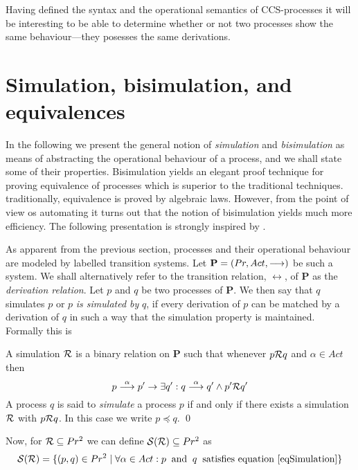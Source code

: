 Having defined the syntax and the operational semantics of CCS-processes it will be interesting to be able to determine whether or not two processes show the same behaviour---they posesses the same derivations.


\section{Simulation, bisimulation, and equivalences}

In the following we present the general notion of {\it simulation\/} and {\it bisimulation\/} as means of abstracting the operational behaviour of a process, and we shall state some of their properties. Bisimulation yields an elegant proof technique for proving equivalence of processes which is superior to the traditional techniques. traditionally, equivalence is proved by algebraic laws. However, from the point of view os automating it turns out that the notion of bisimulation yields much more efficiency. The following presentation is strongly inspired by \cite{Larsen}.

As apparent from the previous section, processes and their operational behaviour are modeled by labelled transition systems. Let $\hbox{\bf P} = ( 
Pr, Act, \stackrel{}{\longrightarrow})$ be such a system. We shall alternatively refer to the transition relation, $\rel{}$, of {\bf P} as the {\it derivation relation}. Let $p$ and $q$ be two processes of {\bf P}. We then say that $q$ simulates $p$ or $p$ {\it is simulated by\/} $q$, if every derivation of $p$ can be matched by a derivation of $q$ in such a way that the simulation property is maintained. Formally this is

\begin{definition}[Simulation]\label{defSimulation}
A simulation $\cal R$ is a binary relation on \hbox{\bf P} such that whenever $p{\cal R}q$ and $\alpha\in Act$ then
\begin{equation}
p\stackrel{\alpha}{\longrightarrow}p' \rightarrow \exists q': q\stackrel{\alpha}{\longrightarrow}q' \wedge p'{\cal R}q'
\label{eqSimulation}
\end{equation}
A process $q$ is said to {\em simulate\/} a process $p$ if and only if there exists a simulation $\cal R$ with $p{\cal R}q$. In this case we write $p\preceq q$.
\qed
\end{definition}

\noindent
Now, for ${\cal R}\subseteq Pr^2$ we can define ${\cal S(R)}\subseteq Pr^2$ as
\begin{equation}
{\cal S(R)} = \{(p,q)\in Pr^2\mid\forall\alpha\in Act : p\;\;\hbox{and}\;\; q\;\;\hbox{satisfies equation~\ref{eqSimulation}}\}
\end{equation}

